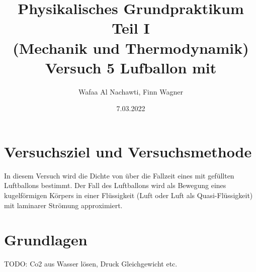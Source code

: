 \documentclass{article}
\date{7.03.2022}
\title{Physikalisches Grundpraktikum Teil I \\ (Mechanik und Thermodynamik) \\ Versuch 5 Lufballon mit \ce{CO2}}
\author{Wafaa Al Nachawti, Finn Wagner}
\begin{document}
    \maketitle

    \section{Versuchsziel und Versuchsmethode}
    In diesem Versuch wird die Dichte von  über die Fallzeit eines mit  gefüllten Luftballons bestimmt.
    Der Fall des Luftballons wird als Bewegung eines kugelförmigen Körpers in einer Flüssigkeit (Luft oder Luft als Quasi-Flüssigkeit) mit laminarer Strömung approximiert.

    \section{Grundlagen}
    TODO: Co2 aus Wasser lösen, Druck Gleichgewicht etc.
\end{document}
